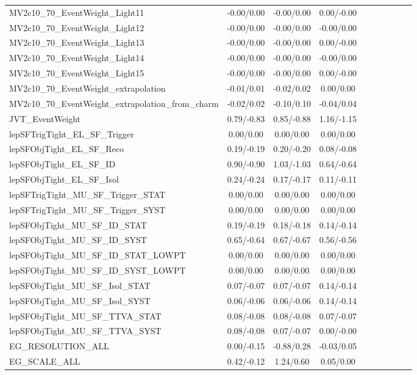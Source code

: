 \begin{table}[h]
\begin{center}
\begin{tabular}{l|ccccccccc}
MV2c10\_70\_EventWeight\_Light11 &-0.00/0.00 &-0.00/0.00 &0.00/-0.00 \\
MV2c10\_70\_EventWeight\_Light12 &-0.00/0.00 &-0.00/0.00 &-0.00/0.00 \\
MV2c10\_70\_EventWeight\_Light13 &-0.00/0.00 &-0.00/0.00 &0.00/-0.00 \\
MV2c10\_70\_EventWeight\_Light14 &-0.00/0.00 &-0.00/0.00 &-0.00/0.00 \\
MV2c10\_70\_EventWeight\_Light15 &-0.00/0.00 &-0.00/0.00 &0.00/-0.00 \\
MV2c10\_70\_EventWeight\_extrapolation &-0.01/0.01 &-0.02/0.02 &0.00/0.00 \\
MV2c10\_70\_EventWeight\_extrapolation\_from\_charm &-0.02/0.02 &-0.10/0.10 &-0.04/0.04 \\
JVT\_EventWeight &0.79/-0.83 &0.85/-0.88 &1.16/-1.15 \\
lepSFTrigTight\_EL\_SF\_Trigger &0.00/0.00 &0.00/0.00 &0.00/0.00 \\
lepSFObjTight\_EL\_SF\_Reco &0.19/-0.19 &0.20/-0.20 &0.08/-0.08 \\
lepSFObjTight\_EL\_SF\_ID &0.90/-0.90 &1.03/-1.03 &0.64/-0.64 \\
lepSFObjTight\_EL\_SF\_Isol &0.24/-0.24 &0.17/-0.17 &0.11/-0.11 \\
lepSFTrigTight\_MU\_SF\_Trigger\_STAT &0.00/0.00 &0.00/0.00 &0.00/0.00 \\
lepSFTrigTight\_MU\_SF\_Trigger\_SYST &0.00/0.00 &0.00/0.00 &0.00/0.00 \\
lepSFObjTight\_MU\_SF\_ID\_STAT &0.19/-0.19 &0.18/-0.18 &0.14/-0.14 \\
lepSFObjTight\_MU\_SF\_ID\_SYST &0.65/-0.64 &0.67/-0.67 &0.56/-0.56 \\
lepSFObjTight\_MU\_SF\_ID\_STAT\_LOWPT &0.00/0.00 &0.00/0.00 &0.00/0.00 \\
lepSFObjTight\_MU\_SF\_ID\_SYST\_LOWPT &0.00/0.00 &0.00/0.00 &0.00/0.00 \\
lepSFObjTight\_MU\_SF\_Isol\_STAT &0.07/-0.07 &0.07/-0.07 &0.14/-0.14 \\
lepSFObjTight\_MU\_SF\_Isol\_SYST &0.06/-0.06 &0.06/-0.06 &0.14/-0.14 \\
lepSFObjTight\_MU\_SF\_TTVA\_STAT &0.08/-0.08 &0.08/-0.08 &0.07/-0.07 \\
lepSFObjTight\_MU\_SF\_TTVA\_SYST &0.08/-0.08 &0.07/-0.07 &0.00/-0.00 \\
EG\_RESOLUTION\_ALL &0.00/-0.15 &-0.88/0.28 &-0.03/0.05 \\
EG\_SCALE\_ALL &0.42/-0.12 &1.24/0.60 &0.05/0.00 \\

\end{tabular}
\end{center}
\end{table}
